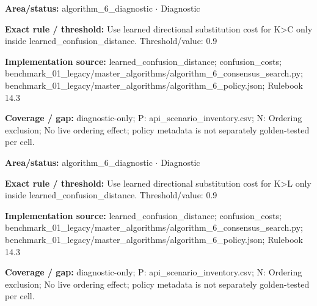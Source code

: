 \begin{tcolorbox}[enhanced,breakable,colback=white,colframe=Muted!45,boxrule=0.45pt,arc=1.5pt,left=6pt,right=6pt,top=5pt,bottom=5pt,title={\texttt{A6-LEARNED-SUBSTITUTION-K-C}},title after break={\texttt{A6-LEARNED-SUBSTITUTION-K-C}\ (continued)},fonttitle=\headingfont\bfseries\color{Navy},coltitle=Navy]
\textbf{Area/status:} algorithm\_\allowbreak{}6\_\allowbreak{}diagnostic $\boldsymbol{\cdot}$ Diagnostic\par
\smallskip
\textbf{Exact rule / threshold:} Use learned directional substitution cost for K>C only inside learned\_\allowbreak{}confusion\_\allowbreak{}distance. Threshold/\allowbreak{}value: 0.9\par
\smallskip
\textbf{Implementation source:} learned\_\allowbreak{}confusion\_\allowbreak{}distance; confusion\_\allowbreak{}costs; benchmark\_\allowbreak{}01\_\allowbreak{}legacy/\allowbreak{}master\_\allowbreak{}algorithms/\allowbreak{}algorithm\_\allowbreak{}6\_\allowbreak{}consensus\_\allowbreak{}search.py; benchmark\_\allowbreak{}01\_\allowbreak{}legacy/\allowbreak{}master\_\allowbreak{}algorithms/\allowbreak{}algorithm\_\allowbreak{}6\_\allowbreak{}policy.json; Rulebook 14.3\par
\smallskip
\textbf{Coverage / gap:} diagnostic-only; P: api\_\allowbreak{}scenario\_\allowbreak{}inventory.csv; N: Ordering exclusion; No live ordering effect; policy metadata is not separately golden-tested per cell.
\end{tcolorbox}
\begin{tcolorbox}[enhanced,breakable,colback=white,colframe=Muted!45,boxrule=0.45pt,arc=1.5pt,left=6pt,right=6pt,top=5pt,bottom=5pt,title={\texttt{A6-LEARNED-SUBSTITUTION-K-L}},title after break={\texttt{A6-LEARNED-SUBSTITUTION-K-L}\ (continued)},fonttitle=\headingfont\bfseries\color{Navy},coltitle=Navy]
\textbf{Area/status:} algorithm\_\allowbreak{}6\_\allowbreak{}diagnostic $\boldsymbol{\cdot}$ Diagnostic\par
\smallskip
\textbf{Exact rule / threshold:} Use learned directional substitution cost for K>L only inside learned\_\allowbreak{}confusion\_\allowbreak{}distance. Threshold/\allowbreak{}value: 0.9\par
\smallskip
\textbf{Implementation source:} learned\_\allowbreak{}confusion\_\allowbreak{}distance; confusion\_\allowbreak{}costs; benchmark\_\allowbreak{}01\_\allowbreak{}legacy/\allowbreak{}master\_\allowbreak{}algorithms/\allowbreak{}algorithm\_\allowbreak{}6\_\allowbreak{}consensus\_\allowbreak{}search.py; benchmark\_\allowbreak{}01\_\allowbreak{}legacy/\allowbreak{}master\_\allowbreak{}algorithms/\allowbreak{}algorithm\_\allowbreak{}6\_\allowbreak{}policy.json; Rulebook 14.3\par
\smallskip
\textbf{Coverage / gap:} diagnostic-only; P: api\_\allowbreak{}scenario\_\allowbreak{}inventory.csv; N: Ordering exclusion; No live ordering effect; policy metadata is not separately golden-tested per cell.
\end{tcolorbox}
